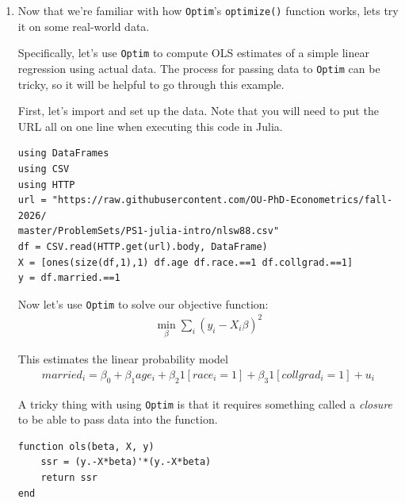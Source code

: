 \documentclass[12pt,english]{article}
\begin{document}
\begin{enumerate}
\begin{verbatim}
 * Work counters
    Seconds run:   0  (vs limit Inf)
    Iterations:    6
    f(x) calls:    27
    Nablaf(x) calls:   27
\end{verbatim}

And we can see the maximum is $\text{-}\left(\text{-}9.643\times 10^2\right)=964.3$. To get the optimizer, we have to issue a call at the REPL:
\begin{verbatim}
julia> println(result.minimizer)
[-7.378243405529116]
\end{verbatim}
which shows that the argmax is at $\approx$-7.38.

\item Now that we're familiar with how \texttt{Optim}'s \texttt{optimize()} function works, lets try it on some real-world data. 

Specifically, let's use \texttt{Optim} to compute OLS estimates of a simple linear regression using actual data. The process for passing data to \texttt{Optim} can be tricky, so it will be helpful to go through this example.

First, let's import and set up the data. Note that you will need to put the URL all on one line when executing this code in Julia.

\begin{verbatim}
using DataFrames
using CSV
using HTTP
url = "https://raw.githubusercontent.com/OU-PhD-Econometrics/fall-2026/
master/ProblemSets/PS1-julia-intro/nlsw88.csv"
df = CSV.read(HTTP.get(url).body, DataFrame)
X = [ones(size(df,1),1) df.age df.race.==1 df.collgrad.==1]
y = df.married.==1
\end{verbatim}

Now let's use \texttt{Optim} to solve our objective function:
\begin{align*}
    \min_\beta \sum_i\left(y_i - 
    X_i\beta\right)^2
\end{align*}

This estimates the linear probability model
\begin{align*}
    married_i = \beta_0 + \beta_1 age_i + \beta_2 1[race_i=1] + \beta_3 1[collgrad_i=1] + u_i
\end{align*}

A tricky thing with using \texttt{Optim} is that it requires something called a \textit{closure} to be able to pass data into the function.

\begin{verbatim}
function ols(beta, X, y)
    ssr = (y.-X*beta)'*(y.-X*beta)
    return ssr
end


\end{verbatim}
\end{enumerate}
\end{document}
